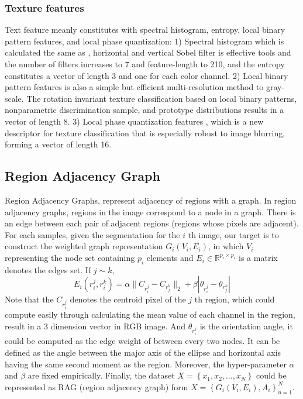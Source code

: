 \documentclass[11pt]{article}
\begin{document}
\subsubsection{Texture features}
Text feature meanly constitutes with spectral histogram, entropy, local binary pattern features, and local phase quantization: 1) Spectral histogram which is calculated the same as \cite{chaudhuri2016region}, horizontal and vertical Sobel filter is effective tools and the number of filters increases to 7 and feature-length to 210, and the entropy constitutes a vector of length 3 and one for each color channel. 2) Local binary pattern features \cite{Ojala2002Multiresolution} is also a simple but efficient multi-resolution method to gray-scale. The rotation invariant texture classification based on local binary patterns, nonparametric discrimination sample, and prototype distributions results in a vector of length 8. 3) Local phase quantization features \cite{Heikkil2008Blur}, which is a new descriptor for texture classification that is especially robust to image blurring, forming a vector of length 16.

\subsection{Region Adjacency Graph}
Region Adjacency Graphs, represent adjacency of regions with a graph. In region adjacency graphs, regions in the image correspond to a node in a graph. There is an edge between each pair of adjacent regions (regions whose pixels are adjacent). For each samples, given the segmentation for the $i$ th image, our target is to construct the weighted graph representation $G_i(V_i,E_i)$, in which $V_i$ representing the node set containing $p_i$ elements and $E_i\in\mathbb{R}^{p_i\times p_i}$ is a matrix denotes the edges set. If $j\sim k$,
\begin{equation}
	E_i(r_i^j,r_i^k) = \alpha\|C_{r_i^j}-C_{r_j^k}\|_2 + \beta|\theta_{r_i^j}-\theta_{r_j^k}|
\end{equation}
Note that the $C_{r_i^j}$ denotes the centroid pixel of the $j$ th region, which could compute easily through calculating the mean value of each channel in the region, result in a 3 dimension vector in RGB image. And $\theta_{r_i^j}$ is the orientation angle, it could be computed as the edge weight of between every two nodes. It can be defined as the angle between the major axis of the ellipse and horizontal axis having the same second moment as the region. Moreover, the hyper-parameter $\alpha$ and $\beta$ are fixed empirically. Finally, the dataset $X=\left\{x_1,x_2,\dots,x_N\right\}$ could be represented as RAG (region adjacency graph) form $X=\left\{G_i(V_i,E_i),A_i\right\}_{n=1}^N$.
\end{document}

